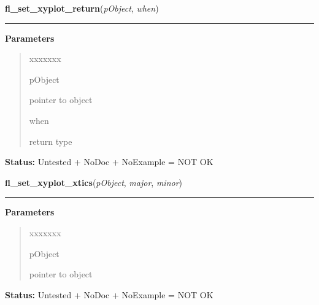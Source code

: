 \hspace{.8\funcindent}\begin{boxedminipage}{\funcwidth}

    \raggedright \textbf{fl\_set\_xyplot\_return}(\textit{pObject}, \textit{when})

    \vspace{-1.5ex}

    \rule{\textwidth}{0.5\fboxrule}
\setlength{\parskip}{2ex}
\setlength{\parskip}{1ex}
      \textbf{Parameters}
      \vspace{-1ex}

      \begin{quote}
        \begin{Ventry}{xxxxxxx}

          \item[pObject]

          pointer to object

          \item[when]

          return type

        \end{Ventry}

      \end{quote}

\textbf{Status:} Untested + NoDoc + NoExample = NOT OK



    \end{boxedminipage}

    \label{xformslib:library:fl_set_xyplot_xtics}

    \vspace{0.5ex}

\hspace{.8\funcindent}\begin{boxedminipage}{\funcwidth}

    \raggedright \textbf{fl\_set\_xyplot\_xtics}(\textit{pObject}, \textit{major}, \textit{minor})

    \vspace{-1.5ex}

    \rule{\textwidth}{0.5\fboxrule}
\setlength{\parskip}{2ex}
\setlength{\parskip}{1ex}
      \textbf{Parameters}
      \vspace{-1ex}

      \begin{quote}
        \begin{Ventry}{xxxxxxx}

          \item[pObject]

          pointer to object

        \end{Ventry}

      \end{quote}

\textbf{Status:} Untested + NoDoc + NoExample = NOT OK



    \end{boxedminipage}


